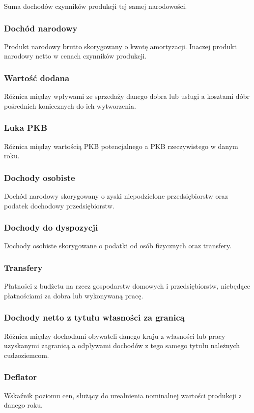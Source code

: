 \documentclass[a4paper,12pt]{article}
\begin{document}
Suma dochodów czynników produkcji tej samej narodowości.

\subsubsection*{Dochód narodowy}
Produkt narodowy brutto skorygowany o kwotę amortyzacji. Inaczej produkt narodowy netto w cenach czynników produkcji.

\subsubsection*{Wartość dodana}
Różnica między wpływami ze sprzedaży danego dobra lub usługi a kosztami dóbr pośrednich koniecznych do ich wytworzenia.

\subsubsection*{Luka PKB}
Różnica między wartością PKB potencjalnego a PKB rzeczywistego w danym roku.
\subsubsection*{Dochody osobiste}
Dochód narodowy skorygowany o zyski niepodzielone przedsiębiorstw oraz podatek dochodowy przedsiębiorstw.
\subsubsection*{Dochody do dyspozycji}
Dochody osobiste skorygowane o podatki od osób fizycznych oraz transfery.
\subsubsection*{Transfery}
Płatności z budżetu na rzecz gospodarstw domowych i przedsiębiorstw, niebędące płatnościami za dobra lub wykonywaną pracę.

\subsubsection*{Dochody netto z tytułu własności za granicą}
Różnica między dochodami obywateli danego kraju z własności lub pracy uzyskanymi zagranicą a odpływami dochodów z tego samego tytułu należnych cudzoziemcom.
\subsubsection*{Deflator}
Wskaźnik poziomu cen, służący do urealnienia nominalnej wartości produkcji z danego roku.
\end{document}
